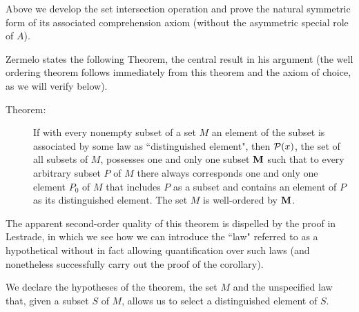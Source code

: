 \documentclass[12pt]{article}
\begin{document}
Above we develop the set intersection operation and prove the natural symmetric form of its associated comprehension axiom (without the asymmetric special role of $A$).

Zermelo states the following Theorem, the central result in his argument (the well ordering theorem follows immediately from this theorem and the axiom of choice, as we will verify below).

\begin{description}

\item[Theorem:]  If with every nonempty subset of a set $M$ an element of the subset is associated by some law as ``distinguished element", then ${\cal P}(x)$, the set of all subsets of $M$, possesses one and only one subset ${\bf M}$ such that to every arbitrary subset $P$ of $M$  there always corresponds one and only one element $P_0$ of $M$ that includes $P$ as a subset and contains an element of $P$ as its distinguished element.  The set $M$ is well-ordered by ${\bf M}$.

\end{description}

The apparent second-order quality of this theorem is dispelled by the proof in Lestrade, in which we see how we can introduce the ``law" referred to as a hypothetical without in fact allowing quantification over such laws (and nonetheless successfully carry out the proof of the corollary).



We declare the hypotheses of the theorem, the set $M$ and the unspecified law that, given a subset $S$ of $M$, allows us to select a distinguished element of $S$.
\end{document}

